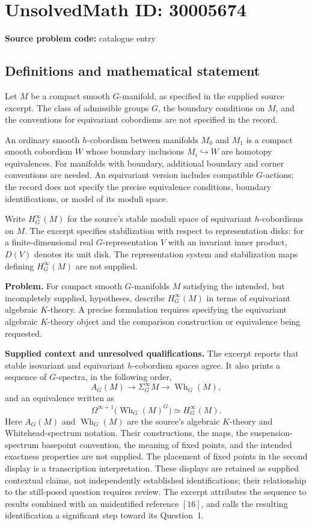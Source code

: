 \documentclass[11pt]{article}
\begin{document}
\section*{UnsolvedMath ID: 30005674}
\textbf{Source problem code:} catalogue entry
\subsection{Definitions and mathematical statement}
Let \(M\) be a compact smooth \(G\)-manifold, as specified in the supplied source excerpt. The class of admissible groups \(G\), the boundary conditions on \(M\), and the conventions for equivariant cobordisms are not specified in the record.

An ordinary smooth \(h\)-cobordism between manifolds \(M_0\) and \(M_1\) is a compact smooth cobordism \(W\) whose boundary inclusions \(M_i\hookrightarrow W\) are homotopy equivalences. For manifolds with boundary, additional boundary and corner conventions are needed. An equivariant version includes compatible \(G\)-actions; the record does not specify the precise equivalence conditions, boundary identifications, or model of its moduli space.

Write \(H_G^\infty(M)\) for the source's stable moduli space of equivariant \(h\)-cobordisms on \(M\). The excerpt specifies stabilization with respect to representation disks: for a finite-dimensional real \(G\)-representation \(V\) with an invariant inner product, \(D(V)\) denotes its unit disk. The representation system and stabilization maps defining \(H_G^\infty(M)\) are not supplied.

\textbf{Problem.} For compact smooth \(G\)-manifolds \(M\) satisfying the intended, but incompletely supplied, hypotheses, describe \(H_G^\infty(M)\) in terms of equivariant algebraic \(K\)-theory. A precise formulation requires specifying the equivariant algebraic \(K\)-theory object and the comparison construction or equivalence being requested.

\textbf{Supplied context and unresolved qualifications.} The excerpt reports that stable isovariant and equivariant \(h\)-cobordism spaces agree. It also prints a sequence of \(G\)-spectra, in the following order,
\[
 A_G(M)\longrightarrow \Sigma_G^\infty M\longrightarrow \operatorname{Wh}_G(M),
\]
and an equivalence written as
\[
 \Omega^{\infty+1}\bigl(\operatorname{Wh}_G(M)^G\bigr)
 \simeq H_G^\infty(M).
\]
Here \(A_G(M)\) and \(\operatorname{Wh}_G(M)\) are the source's algebraic \(K\)-theory and Whitehead-spectrum notation. Their constructions, the maps, the suspension-spectrum basepoint convention, the meaning of fixed points, and the intended exactness properties are not supplied. The placement of fixed points in the second display is a transcription interpretation. These displays are retained as supplied contextual claims, not independently established identifications; their relationship to the still-posed question requires review. The excerpt attributes the sequence to results combined with an unidentified reference \([16]\), and calls the resulting identification a significant step toward its Question~1.
\end{document}
